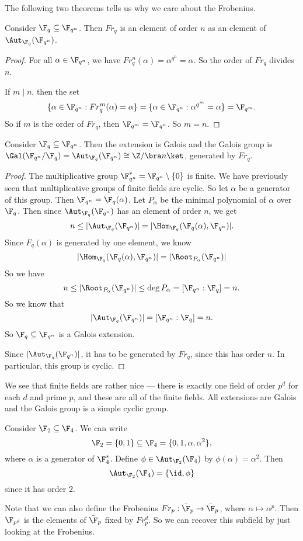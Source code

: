 \documentclass[a4paper]{article}
\begin{document}
The following two theorems tells us why we care about the Frobenius.
\begin{thm}
  Consider $\F_q \subseteq \F_{q^n}$. Then $Fr_q$ is an element of order $n$ as an element of $\Aut_{\F_q}(\F_{q^n})$.
\end{thm}

\begin{proof}
  For all $\alpha \in \F_{q^n}$, we have $Fr_q^n (\alpha) = \alpha^{q^n} = \alpha$. So the order of $Fr_q$ divides $n$.

  If $m \mid n$, then the set
  \[
    \{\alpha \in \F_{q^n} : Fr_q^m (\alpha) = \alpha\} = \{\alpha \in \F_{q^n}: \alpha^{q^m} = \alpha\} = \F_{q^m}.
  \]
  So if $m$ is the order of $Fr_q$, then $\F_{q^m} = \F_{q^n}$. So $m = n$.
\end{proof}

\begin{thm}
  Consider $\F_q \subseteq \F_{q^n}$. Then the extension is Galois and the Galois group is $\Gal(\F_{q^n}/\F_q) = \Aut_{\F_q}(\F_{q^n}) \cong \Z/\bra n\ket$, generated by $Fr_q$.
\end{thm}

\begin{proof}
  The multiplicative group $\F_{q^n}^* = \F_{q^n} \setminus \{0\}$ is finite. We have previously seen that multiplicative groups of finite fields are cyclic. So let $\alpha$ be a generator of this group. Then $\F_{q^n} = \F_q(\alpha)$. Let $P_\alpha$ be the minimal polynomial of $\alpha$ over $\F_q$. Then since $\Aut_{\F_q}(\F_{q^n})$ has an element of order $n$, we get
  \[
    n \leq |\Aut_{\F_q}(\F_{q^n})| = |\Hom_{\F_q}(\F_q(\alpha), \F_{q^n})|.
  \]
  Since $F_q(\alpha)$ is generated by one element, we know
  \[
    |\Hom_{\F_q}(\F_q(\alpha), \F_{q^n})| = |\Root_{P_\alpha}(\F_{q^n})|
  \]
  So we have
  \[
    n \leq |\Root_{P_\alpha}(\F_{q^n})| \leq \deg P_\alpha = [\F_{q^n}: \F_q] = n.
  \]
  So we know that
  \[
    |\Aut_{\F_q}(\F_{q^n})| = [\F_{q^n} : \F_q] = n.
  \]
  So $\F_q \subseteq \F_{q^n}$ is a Galois extension.

  Since $|\Aut_{\F_q}(\F_{q^n})|$, it has to be generated by $Fr_q$, since this has order $n$. In particular, this group is cyclic.
\end{proof}
We see that finite fields are rather nice --- there is exactly one field of order $p^d$ for each $d$ and prime $p$, and these are all of the finite fields. All extensions are Galois and the Galois group is a simple cyclic group.

\begin{eg}
  Consider $\F_2 \subseteq \F_4$. We can write
  \[
    \F_2 = \{0, 1\} \subseteq \F_4 = \{0, 1, \alpha, \alpha^2\},
  \]
  where $\alpha$ is a generator of $\F_4^*$. Define $\phi \in \Aut_{\F_2}(\F_4)$ by $\phi(\alpha) = \alpha^2$. Then
  \[
    \Aut_{\F_2}(\F_4) = \{\id, \phi\}
  \]
  since it has order $2$.
\end{eg}
Note that we can also define the Frobenius $Fr_p: \bar{\F}_p \to \bar{\F}_p$, where $\alpha \mapsto \alpha^p$. Then $\F_{p^d}$ is the elements of $\bar{\F}_p$ fixed by $Fr_p^d$. So we can recover this subfield by just looking at the Frobenius.
\end{document}
